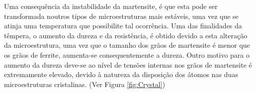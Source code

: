 \par
Uma consequência da instabilidade da martensite, é que esta pode ser transformada noutros tipos de microestruturas mais estáveis, uma vez que se atinja uma temperatura que possibilite tal ocorrência. Uma das finalidades da têmpera, o aumento da dureza e da resistência, é obtido devido a esta alteração da microestrutura, uma vez que o tamanho dos grãos de martensite é menor que os grãos de ferrite, aumenta-se consequentemente a dureza\cite{Krauss2015}. Outro motivo para o aumento da dureza deve-se ao nível de tensões internas nos grãos de martensite é extremamente elevado, devido à natureza da disposição dos átomos nas duas microestruturas cristalinas. (Ver Figura \ref{fig:Crystal})
